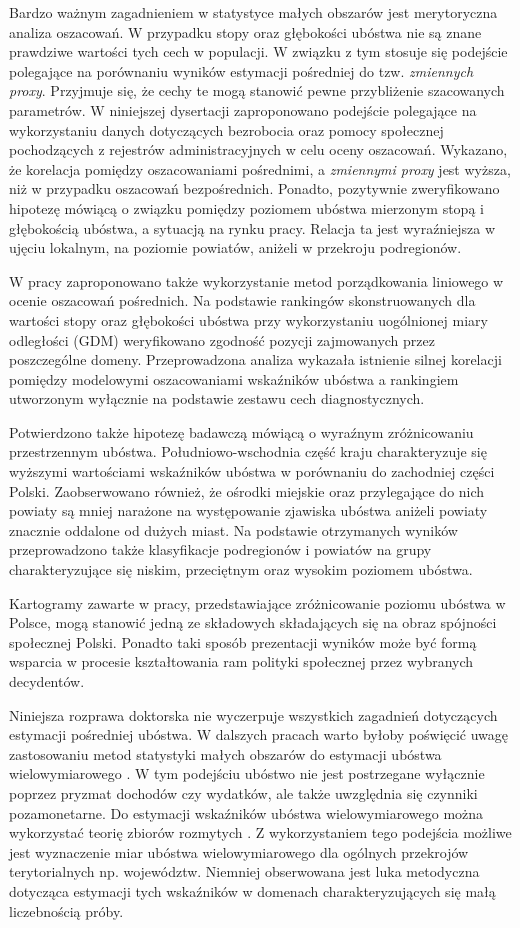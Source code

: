 Bardzo ważnym zagadnieniem w statystyce małych obszarów jest merytoryczna analiza oszacowań. W przypadku stopy oraz głębokości ubóstwa nie są znane prawdziwe wartości tych cech w populacji. W związku z tym stosuje się podejście polegające na porównaniu wyników estymacji pośredniej do tzw. \textit{zmiennych proxy}. Przyjmuje się, że cechy te mogą stanowić pewne przybliżenie szacowanych parametrów. W niniejszej dysertacji zaproponowano podejście polegające na wykorzystaniu danych dotyczących bezrobocia oraz pomocy społecznej pochodzących z rejestrów administracyjnych w celu oceny oszacowań. Wykazano, że korelacja pomiędzy oszacowaniami pośrednimi, a \textit{zmiennymi proxy} jest wyższa, niż w przypadku oszacowań bezpośrednich. Ponadto, pozytywnie zweryfikowano hipotezę mówiącą o związku pomiędzy poziomem ubóstwa mierzonym stopą i głębokością ubóstwa, a sytuacją na rynku pracy. Relacja ta jest wyraźniejsza w ujęciu lokalnym, na poziomie powiatów, aniżeli w przekroju podregionów.

W pracy zaproponowano także wykorzystanie metod porządkowania liniowego w ocenie oszacowań pośrednich. Na podstawie rankingów skonstruowanych dla wartości stopy oraz głębokości ubóstwa przy wykorzystaniu uogólnionej miary odległości (GDM) weryfikowano zgodność pozycji zajmowanych przez poszczególne domeny. Przeprowadzona analiza wykazała istnienie silnej korelacji pomiędzy modelowymi oszacowaniami wskaźników ubóstwa a rankingiem utworzonym wyłącznie na podstawie zestawu cech diagnostycznych.

Potwierdzono także hipotezę badawczą mówiącą o wyraźnym zróżnicowaniu przestrzennym ubóstwa. Południowo-wschodnia część kraju charakteryzuje się wyższymi wartościami wskaźników ubóstwa w porównaniu do zachodniej części Polski. Zaobserwowano również, że ośrodki miejskie oraz przylegające do nich powiaty są mniej narażone na występowanie zjawiska ubóstwa aniżeli powiaty znacznie oddalone od dużych miast. Na podstawie otrzymanych wyników przeprowadzono także klasyfikacje podregionów i powiatów na grupy charakteryzujące się niskim, przeciętnym oraz wysokim poziomem ubóstwa.

Kartogramy zawarte w pracy, przedstawiające zróżnicowanie poziomu ubóstwa w Polsce, mogą stanowić jedną ze składowych składających się na obraz spójności społecznej Polski. Ponadto taki sposób prezentacji wyników może być formą wsparcia w procesie kształtowania ram polityki społecznej przez wybranych decydentów.

Niniejsza rozprawa doktorska nie wyczerpuje wszystkich zagadnień dotyczących estymacji pośredniej ubóstwa. W dalszych pracach warto byłoby poświęcić uwagę zastosowaniu metod statystyki małych obszarów do estymacji ubóstwa wielowymiarowego \citep{panek2010}. W tym podejściu ubóstwo nie jest postrzegane wyłącznie poprzez pryzmat dochodów czy wydatków, ale także uwzględnia się czynniki pozamonetarne. Do estymacji wskaźników ubóstwa wielowymiarowego można wykorzystać teorię zbiorów rozmytych \citep{panek2009}. Z wykorzystaniem tego podejścia możliwe jest wyznaczenie miar ubóstwa wielowymiarowego dla ogólnych przekrojów terytorialnych np. województw. Niemniej obserwowana jest luka metodyczna dotycząca estymacji tych wskaźników w domenach charakteryzujących się małą liczebnością próby.


